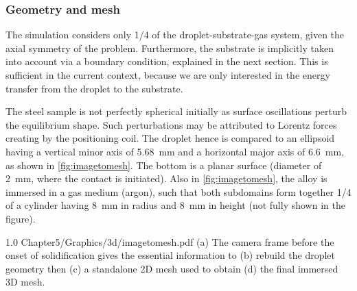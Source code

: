 \subsubsection{Geometry and mesh}

The simulation considers only 1/4 of the droplet-substrate-gas system, given the axial symmetry of the problem.
Furthermore, the substrate is implicitly taken into account via a boundary condition, explained in the next section. 
This is sufficient in the current context, because we are only interested in the energy transfer from the droplet to the substrate. 

The steel sample is not perfectly spherical initially as surface oscillations perturb the equilibrium shape. 
Such perturbations may be attributed to Lorentz forces creating by the positioning coil. 
The droplet hence is compared to an ellipsoid having
a vertical minor axis of \SI{5.68}{\milli \metre} and a horizontal major axis of \SI{6.6}{\milli \metre}, as shown in \cref{fig:imagetomesh}.
The bottom is a planar surface (diameter of \SI{2}{\milli \metre}, where the contact is initiated). 
Also in \cref{fig:imagetomesh}, the alloy is immersed in a gas medium (argon), such that both subdomains form together 1/4 of a 
cylinder having \SI{8}{\milli \metre} in radius and  \SI{8}{\milli \metre} in height (not fully shown in the figure).

\begin{figureth}
{1.0}
{Chapter5/Graphics/3d/imagetomesh.pdf}
{(a) The camera frame before the onset of solidification gives the essential information to (b) 
rebuild the droplet geometry then (c) a standalone 2D mesh used to obtain (d) the final immersed 3D mesh.}
\label{fig:imagetomesh}
\end{figureth}

